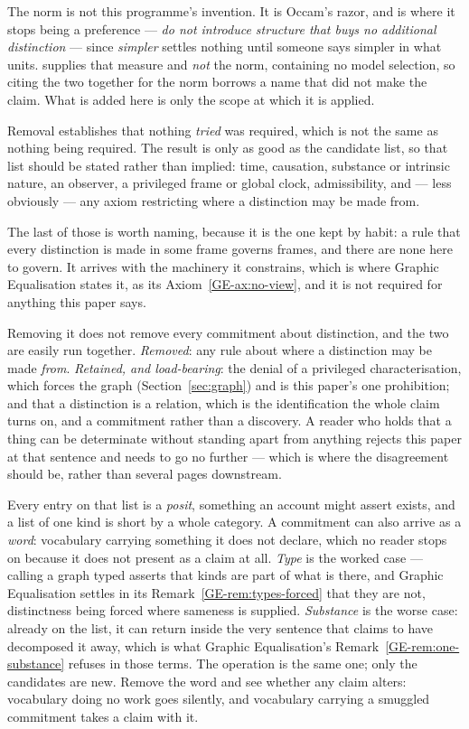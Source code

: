 \documentclass[11pt,a4paper]{article}
\theoremstyle{remark}\newtheorem{remark}[proposition]{Remark}
\begin{document}
The norm is not this programme's invention. It is Occam's razor, and \citet{rissanen1978} is where it
stops being a preference --- \emph{do not introduce structure that buys no additional distinction} ---
since \emph{simpler} settles nothing until someone says simpler in what units. \citet{shannon1948}
supplies that measure and \emph{not} the norm, containing no model selection, so citing the two
together for the norm borrows a name that did not make the claim. What is added here is only the scope at which it is applied.

Removal establishes that nothing \emph{tried} was required, which is not the same as nothing being
required. The result is only as good as the candidate list, so that list should be stated rather than
implied: time, causation, substance or intrinsic nature, an observer, a privileged frame or global
clock, admissibility, and --- less obviously --- any axiom restricting where a distinction may be made
from.

The last of those is worth naming, because it is the one kept by habit: a rule that every distinction
is made in some frame governs frames, and there are none here to govern. It arrives with the machinery
it constrains, which is where Graphic Equalisation states it, as its Axiom~\ref{GE-ax:no-view}, and it
is not required for anything this paper says.

Removing it does not remove every commitment about distinction, and the two are easily run together.
\emph{Removed}: any rule about where a distinction may be made \emph{from}. \emph{Retained, and
load-bearing}: the denial of a privileged characterisation, which forces the graph
(Section~\ref{sec:graph}) and is this paper's one prohibition; and that a distinction is a relation, which is the identification the whole
claim turns on, and a commitment rather than a discovery. A reader who holds that a thing can be
determinate without standing apart from anything rejects this paper at that sentence and needs to go no
further --- which is where the disagreement should be, rather than several pages downstream.

Every entry on that list is a \emph{posit}, something an account might assert exists, and a list of one
kind is short by a whole category. A commitment can also arrive as a \emph{word}: vocabulary carrying
something it does not declare, which no reader stops on because it does not present as a claim at all.
\emph{Type} is the worked case --- calling a graph typed asserts that kinds are part of what is there,
and Graphic Equalisation settles in its Remark~\ref{GE-rem:types-forced} that they are not,
distinctness being forced where sameness is supplied.
\emph{Substance} is the worse case: already on the list, it can return inside the very sentence that
claims to have decomposed it away, which is what Graphic Equalisation's Remark~\ref{GE-rem:one-substance}
refuses in those terms. The operation is the same one; only the candidates are new. Remove the
word and see whether any claim alters: vocabulary doing no work goes silently, and vocabulary carrying
a smuggled commitment takes a claim with it.
\end{document}
